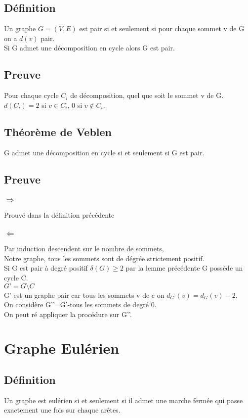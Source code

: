 \documentclass{article}
\begin{document}
\subsection*{Définition}
Un graphe $G=(V,E)$ est pair si et seulement si pour chaque sommet v de G on a $d(v)$ pair. \\
Si G admet une décomposition en cycle alors G est pair.
\subsection*{Preuve}
Pour chaque cycle $C_i$ de décomposition, quel que soit le sommet v de G. \\
$d(C_i)=2$ si $ v \in C_i$, $0$ si $ v \notin C_i$. \\
\newpage
\subsection*{Théorème de Veblen}
G admet une décomposition en cycle si et seulement si G est pair.
\subsection*{Preuve} 
\subsubsection*{$\Rightarrow$ }
Prouvé dans la définition précédente
\subsubsection*{$\Leftarrow$}
Par induction descendent sur le nombre de sommets, \\
Notre graphe, tous les sommets sont de dégrée strictement positif. \\
Si G est pair à degré positif $\delta(G) \geq 2$ par la lemme précédente G possède un cycle C. \\
$G’=G \setminus C$ \\
G’ est un graphe pair car tous les sommets v de c on $d_{G’}(v)=d_{G}(v)-2$. \\
On considère G’’=G’-tous les sommets de degré 0. \\
On peut ré appliquer la procédure sur G’’.  \\
\section{Graphe Eulérien}
\subsection*{Définition}
Un graphe est eulérien si et seulement si il admet une marche fermée qui passe exactement une fois sur chaque arêtes.\\
\\
\end{document}
